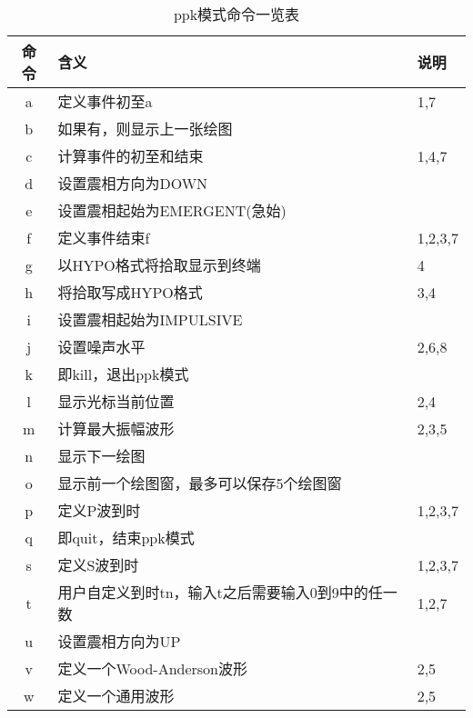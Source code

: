 \begin{table}[H]
\centering
\small
\ttfamily
\caption{ppk模式命令一览表}
\label{table:plotpk-commands}
\begin{tabular}{cll}
	\toprule
    命令	&	含义	                                &   说明    \\
	\midrule
    a	    &	定义事件初至a                           &   1,7	    \\
    b	    &	如果有，则显示上一张绘图	            &           \\
    c	    &	计算事件的初至和结束                    &   1,4,7	\\
    d	    &	设置震相方向为DOWN	                    &           \\
    e     	&	设置震相起始为EMERGENT(急始)	        &           \\
    f	    &	定义事件结束f                           &  1,2,3,7	\\
    g	    &	以HYPO格式将拾取显示到终端              &   4   	\\
    h   	&	将拾取写成HYPO格式                      &   3,4 	\\
    i	    &	设置震相起始为IMPULSIVE	                &           \\
    j	    &	设置噪声水平                            &   2,6,8	\\
    k       &   即kill，退出ppk模式                     &           \\
    l	    &	显示光标当前位置                        &   2,4	    \\
    m	    &	计算最大振幅波形                        &   2,3,5	\\
    n	    &	显示下一绘图	                        &           \\
    o	    &	显示前一个绘图窗，最多可以保存5个绘图窗	&           \\
    p	    &	定义P波到时                             &   1,2,3,7	\\
    q	    &	即quit，结束ppk模式	                            &           \\
    s	    &	定义S波到时                             &   1,2,3,7 \\
    t	    &	用户自定义到时tn，输入t之后需要输入0到9中的任一数	&   1,2,7\\
    u	    &	设置震相方向为UP	                    &           \\
    v	    &	定义一个Wood-Anderson波形               &   2,5 	\\
    w	    &	定义一个通用波形                        &   2,5 	\\

\end{tabular}
\end{table}
